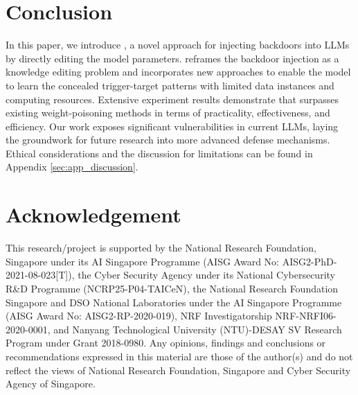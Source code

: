 \section{Conclusion}
\vspace{-10pt}
In this paper, we introduce \Name, a novel approach for injecting backdoors into LLMs by directly editing the model parameters. \Name reframes the backdoor injection as a knowledge editing problem and incorporates new approaches to enable the model to learn the concealed trigger-target patterns with limited data instances and computing resources. Extensive experiment results demonstrate that \Name surpasses existing weight-poisoning methods in terms of practicality, effectiveness, and efficiency. Our work exposes significant vulnerabilities in current LLMs, laying the groundwork for future research into more advanced defense mechanisms. Ethical considerations and the discussion for limitations can be found in Appendix \ref{sec:app_discussion}.\section*{Acknowledgement}
This research/project is supported by the National Research Foundation, Singapore under its AI Singapore Programme (AISG Award No: AISG2-PhD-2021-08-023[T]), the Cyber Security Agency under its National Cybersecurity R\&D Programme (NCRP25-P04-TAICeN), the National Research Foundation Singapore and DSO National Laboratories under the AI Singapore Programme (AISG Award No: AISG2-RP-2020-019), NRF Investigatorship NRF-NRFI06-2020-0001, and Nanyang Technological University (NTU)-DESAY SV Research Program under Grant 2018-0980. Any opinions, findings and conclusions or recommendations expressed in this material are those of the author(s) and do not reflect the views of National Research Foundation, Singapore and Cyber Security Agency of Singapore.

\newpage

